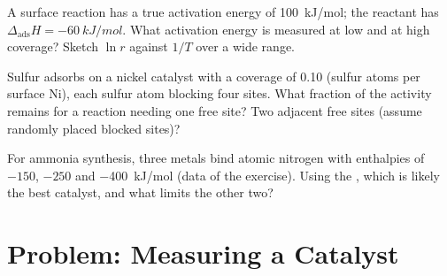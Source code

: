 \begin{exercise}[$\star\star\star$]\label{exo:b3:surfaces-catalysis:10}
A surface reaction has a true activation energy of \qty{100}{kJ/mol}; the reactant has
$\Delta_{\mathrm{ads}}H = \qty{-60}{kJ/mol}$. What activation energy is measured at low and at high
coverage? Sketch $\ln r$ against $1/T$ over a wide range.
\end{exercise}

\begin{exercise}[$\star\star\star$]\label{exo:b3:surfaces-catalysis:11}
Sulfur adsorbs on a nickel catalyst with a coverage of 0.10 (sulfur atoms per
surface Ni), each sulfur atom blocking four sites. What fraction of the activity
remains for a reaction needing one free site? Two adjacent free sites (assume
randomly placed blocked sites)?
\end{exercise}

\begin{exercise}[$\star\star\star$]\label{exo:b3:surfaces-catalysis:12}
For ammonia synthesis, three metals bind atomic nitrogen with enthalpies of
$-150$, $-250$ and \qty{-400}{kJ/mol} (data of the exercise). Using the , which is likely the best catalyst, and what limits the other two?
\end{exercise}

\section{Problem: Measuring a Catalyst}

